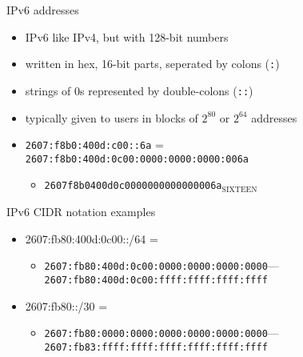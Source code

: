 \begin{frame}{IPv6 addresses}
    \begin{itemize}
    \item IPv6 like IPv4, but with 128-bit numbers
    \item written in hex, 16-bit parts, seperated by colons (\texttt{:})
    \item strings of 0s represented by double-colons (\texttt{::})
    \item typically given to users in blocks of $2^{80}$ or $2^{64}$ addresses
    \vspace{.5cm}
    \item \fontsize{10}{11}\selectfont\texttt{2607:f8b0:400d:c00::6a} = \\
          \texttt{2607:f8b0:400d:0c00:0000:0000:0000:006a}
          \begin{itemize}
          \item \texttt{2607f8b0400d0c0000000000000006a}$_\text{SIXTEEN}$
          \end{itemize}
    \end{itemize}
\end{frame}

\begin{frame}{IPv6 CIDR notation examples}
    \begin{itemize}
    \item 2607:fb80:400d:0c00::/64 = 
        \begin{itemize}
        \item \texttt{2607:fb80:400d:0c00:0000:0000:0000:0000}---\\
              \texttt{2607:fb80:400d:0c00:ffff:ffff:ffff:ffff}
        \end{itemize}
    \item 2607:fb80::/30 = 
        \begin{itemize}
        \item \texttt{2607:fb80:0000:0000:0000:0000:0000:0000}---\\
              \texttt{2607:fb83:ffff:ffff:ffff:ffff:ffff:ffff}
        \end{itemize}
    \end{itemize}
\end{frame}
